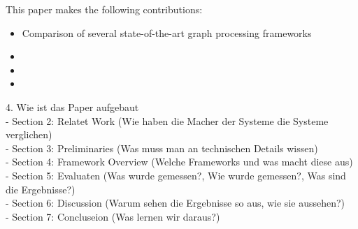 This paper makes the following contributions:
\begin{itemize}
  \item Comparison of several state-of-the-art graph processing frameworks
  \item
  \item
  \item
\end{itemize}


4. Wie ist das Paper aufgebaut\\
- Section 2: Relatet Work (Wie haben die Macher der Systeme die Systeme verglichen)\\
- Section 3: Preliminaries (Was muss man an technischen Details wissen)\\
- Section 4: Framework Overview (Welche Frameworks und was macht diese aus)\\
- Section 5: Evaluaten (Was wurde gemessen?, Wie wurde gemessen?, Was sind die Ergebnisse?)\\
- Section 6: Discussion (Warum sehen die Ergebnisse so aus, wie sie aussehen?)\\
- Section 7: Concluseion (Was lernen wir daraus?)\\















